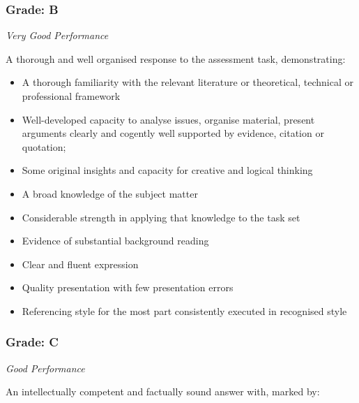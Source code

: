 \subsubsection*{Grade: B}

\textit{Very Good Performance}

A thorough and well organised response to the assessment task, demonstrating:

\begin{itemize}
	\item A thorough familiarity with the relevant literature or theoretical, technical or professional framework
	\item Well-developed capacity to analyse issues, organise material, present arguments clearly and cogently well supported by evidence, citation or quotation;
	\item Some original insights and capacity for creative and logical thinking
	\item A broad knowledge of the subject matter
	\item Considerable strength in applying that knowledge to the task set
	\item Evidence of substantial background reading
	\item Clear and fluent expression
	\item Quality presentation with few presentation errors
	\item Referencing style for the most part consistently executed in recognised style
\end{itemize}


\subsubsection*{Grade: C}

\textit{Good Performance}

An intellectually competent and factually sound answer with, marked by:

